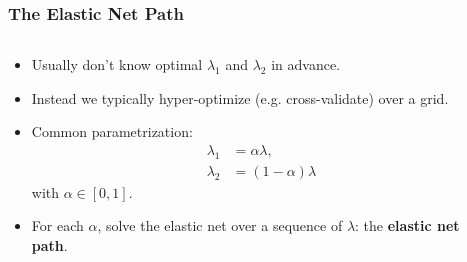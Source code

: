 \documentclass[10pt]{beamer}
\begin{document}
\begin{frame}[c]
  \frametitle{The Elastic Net Path}

  \begin{columns}
    \begin{column}{0.45\textwidth}
      \begin{itemize}[<+->]
        \item Usually don't know optimal \(\lambda_1\) and \(\lambda_2\) in advance.
        \item Instead we typically hyper-optimize (e.g. cross-validate) over a grid.
        \item Common parametrization:
              \begin{align*}
                \lambda_1 & = \alpha\lambda,     \\
                \lambda_2 & = (1- \alpha)\lambda
              \end{align*}
              with \(\alpha \in [0, 1]\).
        \item For each \(\alpha\), solve the elastic net over a sequence of \(\lambda\): the
              \textbf{elastic net path}.
      \end{itemize}
    \end{column}
    \begin{column}{0.45\textwidth}
    \end{column}
  \end{columns}

\end{frame}
\end{document}
